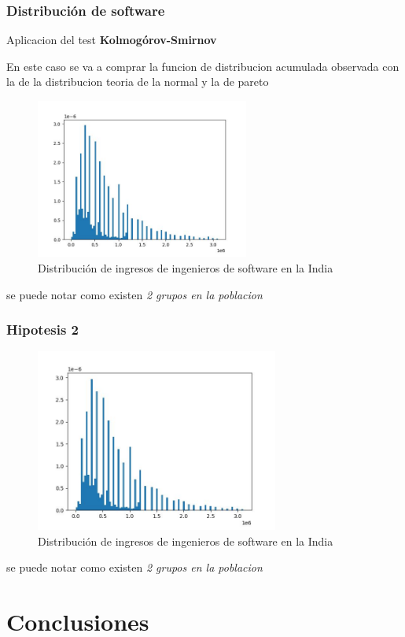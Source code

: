 \documentclass{beamer}
\begin{document}
\begin{frame}
\frametitle{Distribución de software}
  \alert{Aplicacion del test \textbf{Kolmogórov-Smirnov}}

  En este caso se va a comprar la funcion de distribucion acumulada observada
  con la de la distribucion teoria de la normal y la de pareto

\begin{figure}[h]
  \caption{Distribución de ingresos de ingenieros de
  software en la India}
  \includegraphics[width=7cm]{distribucion_ingresos_sw.jpeg}
\end{figure}

  se puede notar como existen \textit{2 grupos en la poblacion}
\end{frame}


\begin{frame}
\frametitle{Hipotesis 2}
\begin{figure}[h]
  \caption{Distribución de ingresos de ingenieros de
  software en la India}
  \includegraphics[width=8cm]{distribucion_ingresos_sw.jpeg}
\end{figure}

  se puede notar como existen \textit{2 grupos en la poblacion}
\end{frame}
\section{Conclusiones}
\end{document}

